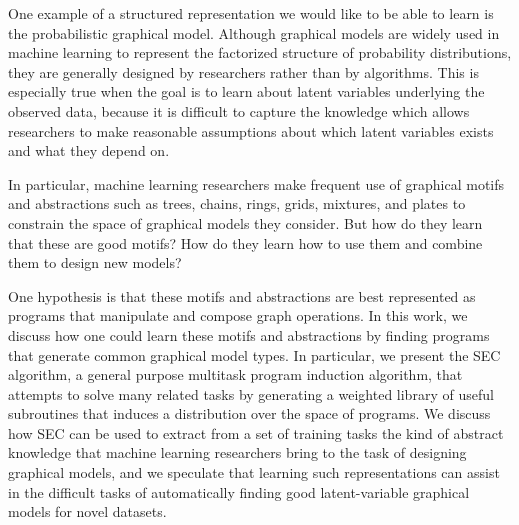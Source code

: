 \documentclass{article} %
\begin{document}
One example of a structured representation we would like to be able to learn is the probabilistic graphical model. Although graphical models are widely used in machine learning to represent the factorized structure of probability distributions, they are generally designed by researchers rather than by algorithms. This is especially true when the goal is to learn about latent variables underlying the observed data, because it is difficult to capture the knowledge which allows researchers to make reasonable assumptions about which latent variables exists and what they depend on. 

In particular, machine learning researchers make frequent use of graphical motifs and abstractions such as trees, chains, rings, grids, mixtures, and plates to constrain the space of graphical models they consider. But how do they learn that these are good motifs? How do they learn how to use them and combine them to design new models? 

One hypothesis is that these motifs and abstractions are best represented as programs that manipulate and compose graph operations. In this work, we discuss how one could learn these motifs and abstractions by finding programs that generate common graphical model types. In particular, we present the SEC algorithm, a general purpose multitask program induction algorithm, that attempts to solve many related tasks by generating a weighted library of useful subroutines that induces a distribution over the space of programs. We discuss how SEC can be used to extract from a set of training tasks the kind of abstract knowledge that machine learning researchers bring to the task of designing graphical models, and we speculate that learning such representations can assist in the difficult tasks of automatically finding good latent-variable graphical models for novel datasets. 

\end{document}
